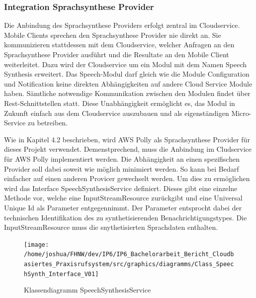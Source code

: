\clearpage
\subsubsection{Integration Sprachsynthese Provider}

Die Anbindung des Sprachsynthese Providers erfolgt zentral im Cloudservice.
Mobile Clients sprechen den Sprachsynthese Provider nie direkt an.
Sie kommunizieren stattdessen mit dem Cloudservice, welcher Anfragen an den Sprachsynthese Provider ausführt und die Resultate an den Mobile Client weiterleitet.
Dazu wird der Cloudservice um ein Modul mit dem Namen Speech Synthesis erweitert.
Das Speech-Modul darf gleich wie die Module Configuration und Notification keine direkten Abhängigkeiten auf andere Cloud Service Module haben.
Sämtliche notwendige Kommunikation zwischen den Modulen findet über Rest-Schnittstellen statt.
Diese Unabhängigkeit ermöglicht es, das Modul in Zukunft einfach aus dem Cloudservice auszubauen und als eigenständigen Micro-Service zu betreiben.

Wie in Kapitel 4.2 beschrieben, wird AWS Polly als Sprachsynthese Provider für dieses Projekt verwendet.
Demenstprechend, muss die Anbindung im Cludservice für AWS Polly implementiert werden.
Die Abhängigkeit an einen spezifischen Provider soll dabei soweit wie möglich minimiert werden.
So kann bei Bedarf einfacher auf einen anderen Provicer gewechselt werden.
Um dies zu ermöglichen wird das Interface SpeechSynthesisService definiert.
Dieses gibt eine einzelne Methode vor, welche eine InputStreamResource zurückgibt und eine Universal Unique Id als Parameter entgegennimmt.
Der Parameter entsprocht dabei der technischen Identifikation des zu synthetisierenden Benachrichtigungstypes.
Die InputStreamResource muss die snythetisierten Sprachdaten enthalten.

\begin{figure}[h]
    \centering
    \begin{minipage}[b]{0.8\textwidth}
        \texttt{[image: /home/joshua/FHNW/dev/IP6/IP6\_Bachelorarbeit\_Bericht\_Cloudbasiertes\_Praxisrufsystem/src/graphics/diagramms/Class\_SpeechSynth\_Interface\_V01]}
        \caption{Klassendiagramm SpeechSynthesisService}
    \end{minipage}
\end{figure}

%


